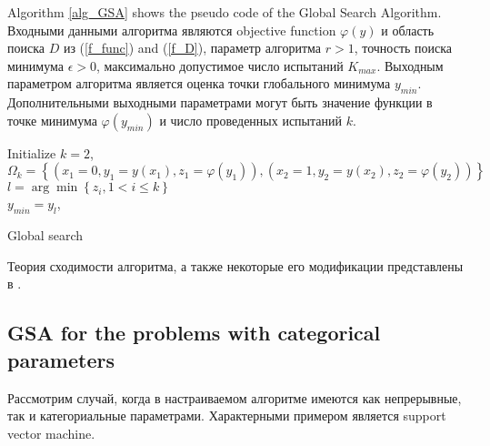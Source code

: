 \documentclass[preprint,12pt]{elsarticle}
\begin{document}
Algorithm \ref{alg_GSA} shows the pseudo code of the Global Search Algorithm.
Входными данными алгоритма являются objective function $\varphi(y)$  и область поиска $D$ из (\ref{f_func}) and (\ref{f_D}), параметр алгоритма $r>1$, точность поиска минимума $\epsilon > 0$, максимально допустимое число испытаний $K_{max}$. Выходным параметром алгоритма является оценка точки глобального минимума $y_{min}$. Дополнительными выходными параметрами могут быть значение функции в точке минимума $\varphi(y_{min})$ и число проведенных испытаний $k$.

\begin{algorithm}
\LinesNumbered
 Initialize $k=2$, $\Omega_k= \left\{ (x_1=0, y_1=y(x_1), z_1=\varphi(y_1)), (x_2=1, y_2=y(x_2), z_2=\varphi(y_2)) \right\}$\\
 $l = \arg \min \left\{ z_i, 1 < i \leq k \right\}$\\
 $y_{min} = y_l$, \\ 
 \caption{Global search}\label{alg_GSA}
\end{algorithm}

Теория сходимости алгоритма, а также некоторые его модификации представлены в \cite{Strongin2000}.

\subsection{GSA for the problems with categorical parameters}
\label{sec_mGSA}

Рассмотрим случай, когда в настраиваемом алгоритме имеются как непрерывные, так и категориальные параметрами. Характерными примером является support vector machine. 
\end{document}
